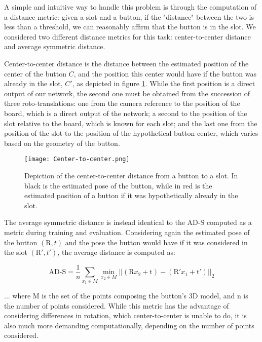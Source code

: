 A simple and intuitive way to handle this problem is through the computation of a distance metric: given a slot and a button, if the "distance" between the two is less than a threshold, we can reasonably affirm that the button is in the slot. We considered two different distance metrics for this task: center-to-center distance and average symmetric distance.

Center-to-center distance is the distance between the estimated position of the center of the button $C$, and the position this center would have if the button was already in the slot, $C'$, as depicted in figure \ref{fig:center2center}. While the first position is a direct output of our network, the second one must be obtained from the succession of three roto-translations: one from the camera reference to the position of the board, which is a direct output of the network; a second to the position of the slot relative to the board, which is known for each slot; and the last one from the position of the slot to the position of the hypothetical button center, which varies based on the geometry of the button.

\begin{figure}[ht]
    \texttt{[image: Center-to-center.png]}
    \caption{Depiction of the center-to-center distance from a button to a slot. In black is the estimated pose of the button, while in red is the estimated position of a button if it was hypothetically already in the slot.}
    \label{fig:center2center}
\end{figure}

The average symmetric distance is instead identical to the AD-S computed as a metric during training and evaluation. Considering again the estimated pose of the button $(\text{R}, t)$ and the pose the button would have if it was considered in the slot $(\text{R}', t')$, the average distance is computed as:

\begin{equation*}
    \text{AD-S} = \frac{1}{n} \sum_{x_1 \in M} \min_{x_2 \in M} ||(\text{R}x_2 + \text{t}) - 
    (\text{R}'x_1 + \text{t}')||_2
\end{equation*}

... where M is the set of the points composing the button's 3D model, and n is the number of points considered. While this metric has the advantage of considering differences in rotation, which center-to-center is unable to do, it is also much more demanding computationally, depending on the number of points considered.

